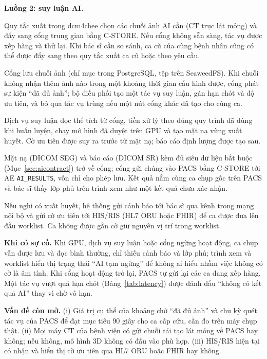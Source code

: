 \textbf{Luồng 2: suy luận AI.}
\begin{description}[leftmargin=1.2cm,style=nextline]
\item[2.1] Quy tắc xuất trong dcm4chee chọn các chuỗi ảnh AI cần (CT trục lát mỏng) và
      đẩy sang cổng trung gian bằng C-STORE. Nếu cổng không sẵn sàng, tác vụ được xếp hàng
      và thử lại. Khi bác sĩ cần so sánh, ca cũ của cùng bệnh nhân cũng có thể được đẩy
      sang theo quy tắc xuất ca cũ hoặc theo yêu cầu.
\item[2.2] Cổng lưu chuỗi ảnh (chỉ mục trong PostgreSQL, tệp trên SeaweedFS). Khi chuỗi
      không nhận thêm ảnh nào trong một khoảng thời gian cấu hình được, cổng phát sự kiện
      ``đã đủ ảnh''; bộ điều phối tạo một tác vụ suy luận, gán hạn chót và độ ưu tiên, và
      bỏ qua tác vụ trùng nếu một nút cổng khác đã tạo cho cùng ca.
\item[2.3] Dịch vụ suy luận đọc thể tích từ cổng, tiền xử lý theo đúng quy trình đã dùng
      khi huấn luyện, chạy mô hình đã duyệt trên GPU và tạo mặt nạ vùng xuất huyết. Cờ ưu
      tiên được suy ra trước từ mặt nạ; báo cáo định lượng được tạo sau.
\item[2.4] Mặt nạ (DICOM SEG) và báo cáo (DICOM SR) kèm đủ siêu dữ liệu bắt buộc
      (Mục~\ref{sec:aicontract}) trở về cổng; cổng gửi chúng vào PACS bằng C-STORE tới AE
      \texttt{AI\_RESULTS}, vốn chỉ cho phép lưu. Kết quả nằm cùng ca chụp gốc trên PACS và
      bác sĩ thấy lớp phủ trên trình xem như một kết quả chưa xác nhận.
\item[2.5] Nếu nghi có xuất huyết, hệ thống gửi cảnh báo tới bác sĩ qua kênh trong mạng
      nội bộ và gửi cờ ưu tiên tới HIS/RIS (HL7 ORU hoặc FHIR) để ca được đưa lên đầu
      worklist. Ca không được gắn cờ giữ nguyên vị trí trong worklist.
\end{description}

\textbf{Khi có sự cố.} Khi GPU, dịch vụ suy luận hoặc cổng ngừng hoạt động, ca chụp
vẫn được lưu và đọc bình thường, chỉ thiếu cảnh báo và lớp phủ; trình xem và worklist
hiển thị trạng thái ``AI tạm ngừng'' để không ai hiểu nhầm việc không có cờ là âm tính.
Khi cổng hoạt động trở lại, PACS tự gửi lại các ca đang xếp hàng. Một tác vụ vượt quá hạn
chót (Bảng~\ref{tab:latency}) được đánh dấu ``không có kết quả AI'' thay vì chờ vô hạn.

\textbf{Vấn đề còn mở.} (i) Giá trị cụ thể của khoảng chờ ``đã đủ ảnh'' và chu kỳ quét
tác vụ của PACS để đạt mục tiêu 90 giây cho ca cấp cứu, cần đo trên máy chụp thật. (ii)
Mọi máy CT của bệnh viện có gửi chuỗi tái tạo lát mỏng về PACS hay không; nếu không, mô
hình 3D không có đầu vào phù hợp. (iii) HIS/RIS hiện tại có nhận và hiển thị cờ ưu tiên
qua HL7 ORU hoặc FHIR hay không.
